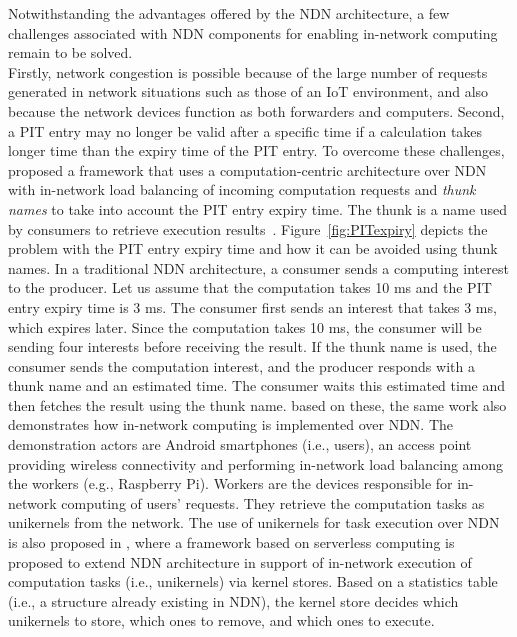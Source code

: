 Notwithstanding the advantages offered by the NDN architecture, a few challenges associated with  NDN components for enabling in-network computing remain to be solved.\\
Firstly, network congestion is possible because of the large number of requests generated in network situations such as those of an IoT environment, and also because the network devices function as both forwarders and computers. Second, a PIT entry may no longer be valid after a specific time if a calculation takes longer time than the expiry time of the PIT entry. To overcome these challenges, \cite{COicn} proposed a framework that uses a computation-centric architecture over NDN with in-network load balancing of incoming computation requests and \textit{thunk names} to take into account the PIT entry expiry time. The thunk is a name used by consumers to retrieve execution results~\cite{RICE}. Figure~\ref{fig:PITexpiry} depicts the problem with the PIT entry expiry time and how it can be avoided using thunk names. In a traditional NDN architecture, a consumer sends a computing interest to the producer. Let us assume that the computation takes 10 ms and the PIT entry expiry time is 3 ms. The consumer first sends an interest that takes 3 ms, which expires later. Since the computation takes 10 ms, the consumer will be sending four interests before receiving the result. If the thunk name is used, the consumer sends the computation interest, and the producer responds with a thunk name and an estimated time. The consumer waits this estimated time and then fetches the result using the thunk name. based on these, the same work also demonstrates how in-network computing is implemented over NDN. The demonstration actors are Android smartphones (i.e., users), an access point providing wireless connectivity and performing in-network load balancing among the workers (e.g., Raspberry Pi). Workers are the devices responsible for in-network computing of users' requests. They retrieve the computation tasks as unikernels from the network. The use of unikernels for task execution over NDN is also proposed in \cite{10.1145/3125719.3125727}, where a framework based on serverless computing is proposed to extend NDN architecture in support of in-network execution of computation tasks (i.e., unikernels) via kernel stores. 
Based on a statistics table (i.e., a structure already existing in NDN), the kernel store decides which unikernels to store, which ones to remove, and which ones to execute.

